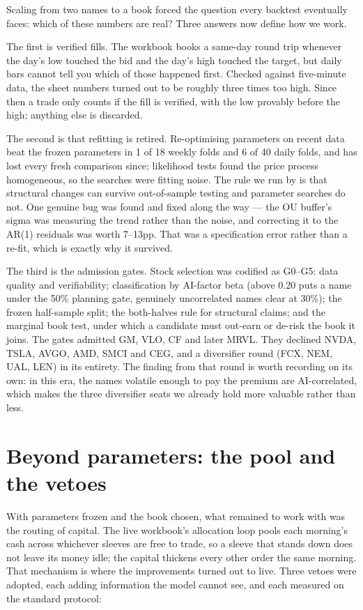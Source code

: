 \documentclass[11pt,a4paper]{article}
\begin{document}
Scaling from two names to a book forced the question every backtest
eventually faces: which of these numbers are real? Three answers now define
how we work.

The first is verified fills. The workbook books a same-day round trip
whenever the day's low touched the bid and the day's high touched the
target, but daily bars cannot tell you which of those happened first.
Checked against five-minute data, the sheet numbers turned out to be roughly
three times too high. Since then a trade only counts if the fill is verified,
with the low provably before the high; anything else is discarded.

The second is that refitting is retired. Re-optimising parameters on recent
data beat the frozen parameters in 1 of 18 weekly folds and 6 of 40 daily
folds, and has lost every fresh comparison since; likelihood tests found the
price process homogeneous, so the searches were fitting noise. The rule we
run by is that structural changes can survive out-of-sample testing and
parameter searches do not. One genuine bug was found and fixed along the way
--- the OU buffer's sigma was measuring the trend rather than the noise, and
correcting it to the AR(1) residuals was worth 7--13pp. That was a
specification error rather than a re-fit, which is exactly why it survived.

The third is the admission gates. Stock selection was codified as G0--G5:
data quality and verifiability; classification by AI-factor beta (above 0.20
puts a name under the 50\% planning gate, genuinely uncorrelated names clear
at 30\%); the frozen half-sample split; the both-halves rule for structural
claims; and the marginal book test, under which a candidate must out-earn or
de-risk the book it joins. The gates admitted GM, VLO, CF and later MRVL.
They declined NVDA, TSLA, AVGO, AMD, SMCI and CEG, and a diversifier round
(FCX, NEM, UAL, LEN) in its entirety. The finding from that round is worth
recording on its own: in this era, the names volatile enough to pay the
premium are AI-correlated, which makes the three diversifier seats we
already hold more valuable rather than less.

\section{Beyond parameters: the pool and the vetoes}

With parameters frozen and the book chosen, what remained to work with was
the routing of capital. The live workbook's allocation loop pools each
morning's cash across whichever sleeves are free to trade, so a sleeve that
stands down does not leave its money idle; the capital thickens every other
order the same morning. That mechanism is where the improvements turned out
to live. Three vetoes were adopted, each adding information the model cannot
see, and each measured on the standard protocol:
\end{document}
